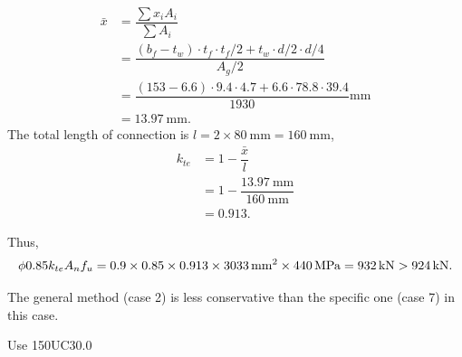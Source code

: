 \begin{solution}
\begin{minipage}{6cm}
\centering
\end{minipage}
\begin{minipage}{.99\linewidth-6cm}
\begin{align*}
\bar{x}&=\dfrac{\sum{}x_iA_i}{\sum{}A_i}\\&=\dfrac{\left(b_f-t_w\right)\cdot{}t_f\cdot{}t_f/2+t_w\cdot{}d/2\cdot{}d/4}{A_g/2}\\
&=\dfrac{\left(153-6.6\right)\cdot{}9.4\cdot{}4.7+6.6\cdot{}78.8\cdot{}39.4}{1930}\si{\mm}\\
&=\SI{13.97}{\mm}.
\end{align*}
The total length of connection is $l=2\times\SI{80}{\mm}=\SI{160}{\mm}$,
\begin{align*}
k_{te}&=1-\dfrac{\bar{x}}{l}\\
&=1-\dfrac{\SI{13.97}{\mm}}{\SI{160}{\mm}}\\
&=0.913.
\end{align*}
\end{minipage}

Thus,
\begin{gather*}
\phi0.85k_{te}A_nf_u=0.9\times0.85\times0.913\times\SI{3033}{\milli\meter^2}\times\SI{440}{\mega\pascal}=\SI{932}{\kilo\newton}>\SI{924}{\kilo\newton}.
\end{gather*}

The general method (case 2) is less conservative than the specific one (case 7) in this case.
\begin{flushright}
Use 150UC30.0
\end{flushright}
\begin{figure}[H]
\centering

\end{figure}
\end{solution}

